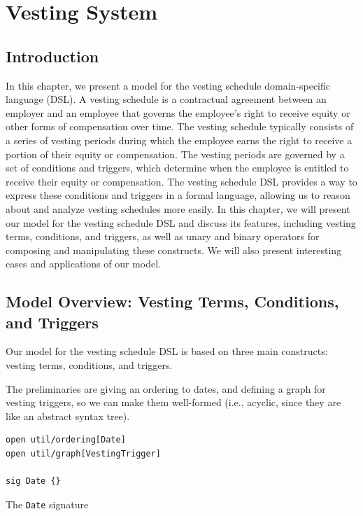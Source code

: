 \chapter{Vesting System}

\section{Introduction}

In this chapter, we present a model for the vesting schedule domain-specific language (DSL). A vesting schedule is a contractual agreement between an employer and an employee that governs the employee's right to receive equity or other forms of compensation over time. The vesting schedule typically consists of a series of vesting periods during which the employee earns the right to receive a portion of their equity or compensation. The vesting periods are governed by a set of conditions and triggers, which determine when the employee is entitled to receive their equity or compensation. The vesting schedule DSL provides a way to express these conditions and triggers in a formal language, allowing us to reason about and analyze vesting schedules more easily. In this chapter, we will present our model for the vesting schedule DSL and discuss its features, including vesting terms, conditions, and triggers, as well as unary and binary operators for composing and manipulating these constructs. We will also present interesting cases and applications of our model.

\section{Model Overview: Vesting Terms, Conditions, and Triggers}

Our model for the vesting schedule DSL is based on three main constructs: vesting terms, conditions, and triggers.

The preliminaries are giving an ordering to dates, and defining a graph for vesting triggers, so we can make them well-formed (i.e., acyclic, since they are like an abstract syntax tree).

\begin{listing}[!h]
\begin{verbatim}
open util/ordering[Date]
open util/graph[VestingTrigger]

sig Date {}
\end{verbatim}
\caption{The \texttt{Date} signature}
\label{lst:date-signature-3}
\end{listing}


